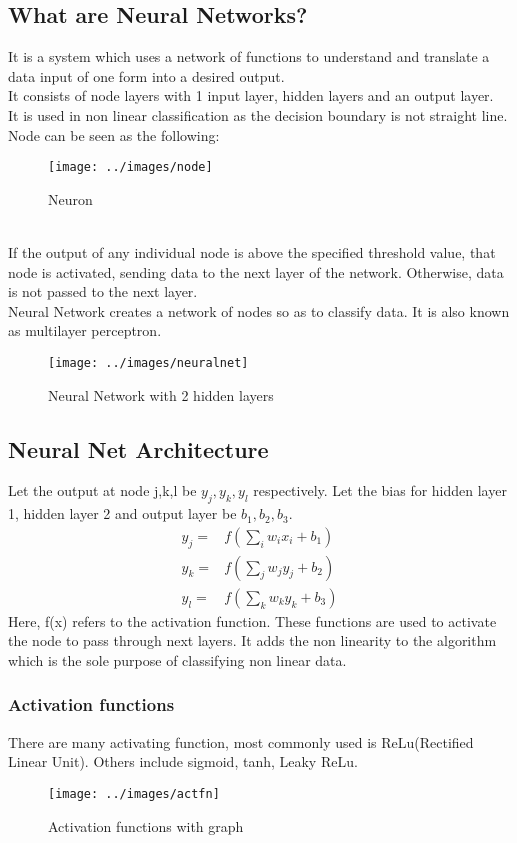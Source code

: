 \documentclass[12pt,letterpaper, onecolumn]{exam}
\begin{document}
\subsection*{What are Neural Networks?}
It is a system which uses a network of functions to understand and translate a data input of one form into a desired output.\\
It consists of node layers with 1 input layer, hidden layers and an output layer.\\
It is used in non linear classification as the decision boundary is not straight line.\\
Node can be seen as the following:\\
\begin{figure}[!h]
\centering
\caption{Neuron}
\texttt{[image: ../images/node]}
\end{figure}
\\
If the output of any individual node is above the specified threshold value, that node is activated, sending data to the next layer of the network. Otherwise, data is not passed to the next layer.\\
Neural Network creates a network of nodes so as to classify data. It is also known as multilayer perceptron.
\begin{figure}[t]
\centering
\caption{Neural Network with 2 hidden layers}
\texttt{[image: ../images/neuralnet]}
\end{figure}

\subsection*{Neural Net Architecture}

Let the output at node j,k,l be $y_j,y_k,y_l$ respectively. Let the bias for hidden layer 1, hidden layer 2 and output layer be $b_1,b_2,b_3$.
\begin{align}
y_j = {}& f(\sum_{i}w_i x_i  + b_1)\\
y_k = {}& f(\sum_{j}w_j y_j  + b_2)\\
y_l = {}& f(\sum_{k}w_k y_k  + b_3)
\end{align}
Here, f(x) refers to the activation function. These functions are used to activate the node to pass through next layers. It adds the non linearity to the algorithm which is the sole purpose of classifying non linear data.

\subsubsection*{Activation functions}
There are many activating function, most commonly used is ReLu(Rectified Linear Unit). Others include sigmoid, tanh, Leaky ReLu.
\begin{figure}[!h]
\centering
\caption{Activation functions with graph}
\texttt{[image: ../images/actfn]}
\end{figure}
\end{document}
